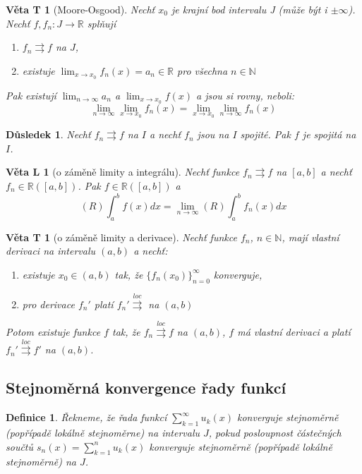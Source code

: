 \documentclass[11pt,a4paper]{article}
\newcounter{vety}
\newtheorem*{definice}{Definice}
\newtheorem{vetal}[vety]{Věta L}
\newtheorem{vetat}[vety]{Věta T}
\newtheorem*{dusledek}{Důsledek}
\newcommand{\con}{\rightrightarrows}
\newcommand{\conloc}{\overset{loc}{\rightrightarrows}}
\begin{document}
\begin{vetat}[Moore-Osgood]
Nechť $x_0$ je krajní bod intervalu J (může být i $\pm \infty$). Nechť $f, f_n : J \rightarrow \mathbb{R}$ splňují
\begin{enumerate}
\item $f_n \con f$ na $J$,
\item existuje $\lim_{x \rightarrow x_0} f_n(x) = a_n \in \mathbb{R}$ pro všechna $n \in \mathbb{N}$
\end{enumerate}
Pak existují $\lim_{n \rightarrow \infty} a_n$ a $\lim_{x \rightarrow x_0} f(x)$ a jsou si rovny, neboli:
$$\lim_{n \rightarrow \infty} \lim_{x \rightarrow x_0} f_n(x) = \lim_{x \rightarrow x_0} \lim_{n \rightarrow \infty} f_n(x)$$
\end{vetat}

\begin{dusledek}
Nechť $f_n \con f$ na $I$ a nechť $f_n$ jsou na $I$ spojité. Pak $f$ je spojitá na $I$.
\end{dusledek}

\begin{vetal}[o záměně limity a integrálu]
Nechť funkce $f_n \con f$ na $[a,b]$ a nechť $f_n \in \mathbb{R} ([a,b])$. Pak $f \in \mathbb{R}([a,b])$ a 
$$(R) \int_a^b f(x) dx = \lim_{n \rightarrow \infty} (R) \int_a^b f_n(x) dx$$
\end{vetal}

\begin{vetat}[o záměně limity a derivace]
Nechť funkce $f_n$, $n \in \mathbb{N}$, mají vlastní derivaci na intervalu $(a,b)$ a nechť:
\begin{enumerate}
\item existuje $x_0 \in (a,b)$ tak, že $\{f_n(x_0)\}_{n=0}^{\infty}$ konverguje,
\item pro derivace $f_n'$ platí $f_n' \conloc$ na $(a,b)$
\end{enumerate}
Potom existuje funkce $f$ tak, že $f_n \conloc f$ na $(a,b)$, $f$ má vlastní derivaci a platí $f_n' \conloc f'$ na $(a,b)$.
\end{vetat}

\subsection{Stejnoměrná konvergence řady funkcí}
\begin{definice}
Řekneme, že řada funkcí $\sum_{k=1}^{\infty} u_k (x)$ konverguje \emph{stejnoměrně} (popřípadě \emph{lokálně stejnoměrne}) na intervalu $J$, pokud posloupnost částečných součtů $s_n(x) = \sum_{k=1}^{n} u_k (x)$ konverguje stejnoměrně (popřípadě lokálně stejnoměrně) na $J$.
\end{definice}
\end{document}
